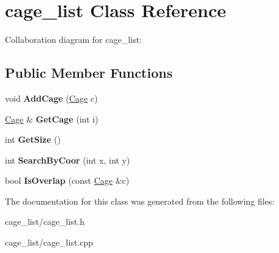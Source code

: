 \hypertarget{classcage__list}{}\section{cage\+\_\+list Class Reference}
\label{classcage__list}


Collaboration diagram for cage\+\_\+list\+:
\subsection*{Public Member Functions}
\begin{DoxyCompactItemize}
\item 
void {\bfseries Add\+Cage} (\hyperlink{classCage}{Cage} c)\hypertarget{classcage__list_a6a936c28a8631dbe1075493ad52e0a31}{}\label{classcage__list_a6a936c28a8631dbe1075493ad52e0a31}

\item 
\hyperlink{classCage}{Cage} \& {\bfseries Get\+Cage} (int i)\hypertarget{classcage__list_a01ec3086049a333334a49b385587c50a}{}\label{classcage__list_a01ec3086049a333334a49b385587c50a}

\item 
int {\bfseries Get\+Size} ()\hypertarget{classcage__list_ad081b5200e87142d4805004fcdaf5056}{}\label{classcage__list_ad081b5200e87142d4805004fcdaf5056}

\item 
int {\bfseries Search\+By\+Coor} (int x, int y)\hypertarget{classcage__list_aa44cc46a9811038a3a48cb7968d4dd30}{}\label{classcage__list_aa44cc46a9811038a3a48cb7968d4dd30}

\item 
bool {\bfseries Is\+Overlap} (const \hyperlink{classCage}{Cage} \&c)\hypertarget{classcage__list_a881e87209a22c09d3716db482b9e469f}{}\label{classcage__list_a881e87209a22c09d3716db482b9e469f}

\end{DoxyCompactItemize}


The documentation for this class was generated from the following files\+:\begin{DoxyCompactItemize}
\item 
cage\+\_\+list/cage\+\_\+list.\+h\item 
cage\+\_\+list/cage\+\_\+list.\+cpp\end{DoxyCompactItemize}
